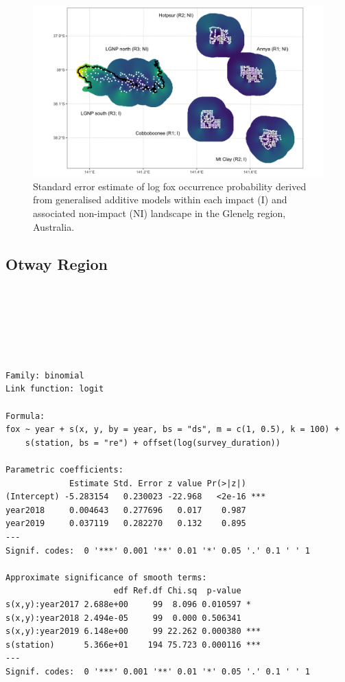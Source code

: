 \documentclass[11pt,a4paper,titlepage,twoside,openright]{style/unimelbthesis}
\begin{document}
\begin{mainmatter}
\begin{figure}
{\centering \includegraphics[width=1\linewidth]{figure/c3/fox_occ_se_glenelg_600dpi} 

}

\caption{Standard error estimate of log fox occurrence probability derived from generalised additive models within each impact (I) and associated non-impact (NI) landscape in the Glenelg region, Australia.}\label{fig:density-fox-se-g}
\end{figure}
\newpage

\hypertarget{otway-region-1}{%
\subsection{Otway Region}\label{otway-region-1}}

\(~\)

\(~\)

\(~\)
\begin{verbatim}

Family: binomial 
Link function: logit 

Formula:
fox ~ year + s(x, y, by = year, bs = "ds", m = c(1, 0.5), k = 100) + 
    s(station, bs = "re") + offset(log(survey_duration))

Parametric coefficients:
             Estimate Std. Error z value Pr(>|z|)    
(Intercept) -5.283154   0.230023 -22.968   <2e-16 ***
year2018     0.004643   0.277696   0.017    0.987    
year2019     0.037119   0.282270   0.132    0.895    
---
Signif. codes:  0 '***' 0.001 '**' 0.01 '*' 0.05 '.' 0.1 ' ' 1

Approximate significance of smooth terms:
                      edf Ref.df Chi.sq  p-value    
s(x,y):year2017 2.688e+00     99  8.096 0.010597 *  
s(x,y):year2018 2.494e-05     99  0.000 0.506341    
s(x,y):year2019 6.148e+00     99 22.262 0.000380 ***
s(station)      5.366e+01    194 75.723 0.000116 ***
---
Signif. codes:  0 '***' 0.001 '**' 0.01 '*' 0.05 '.' 0.1 ' ' 1


\end{verbatim}
\end{mainmatter}
\end{document}
